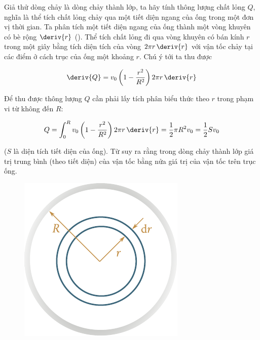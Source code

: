 Giả thử dòng chảy là dòng chảy thành lớp, ta hãy tính thông lượng chất lỏng $Q$, nghĩa là thể tích chất lỏng chảy qua một tiết diện ngang của ống trong một đơn vị thời gian. Ta phân tích một tiết diện ngang của ống thành một vòng khuyên có bè rộng $\deriv{r}$ (). Thể tích chất lỏng đi qua vòng khuyên có bán kính $r$ trong một giây bằng tích diện tích của vòng $2\pi r\,\deriv{r}$ với vận tốc chảy tại các điểm ở cách trục của ống một khoảng $r$. Chú ý tới  ta thu được

\begin{equation}\label{eq:9_21}
	\deriv{Q} = v_0 \left(1 - \frac{r^2}{R^2}\right) 2\pi r\,\deriv{r}
\end{equation}
\noindent


Để thu được thông lượng $Q$ cần phải lấy tích phân biểu thức  theo $r$ trong phạm vi từ không đến $R$:

\begin{equation}\label{eq:9_22}
	Q = \int_{0}^{R} v_0 \left(1 - \frac{r^2}{R^2}\right) 2\pi r\,\deriv{r} = \frac{1}{2}\pi R^2 v_0 = \frac{1}{2}Sv_0
\end{equation}
\noindent


($S$ là diện tích tiết diện của ống). Từ  suy ra rằng trong dòng chảy thành lớp giá trị trung bình (theo tiết diện) của vận tốc bằng nửa giá trị của vận tốc trên trục ống.

\begin{figure}[!htb]
	\begin{center}
		\includegraphics[scale=0.95]{figures/ch_09/fig_9_13.pdf}
		\caption[]{}
		\label{fig:9_13}
	\end{center}
	\vspace{-0.8cm}
\end{figure}

